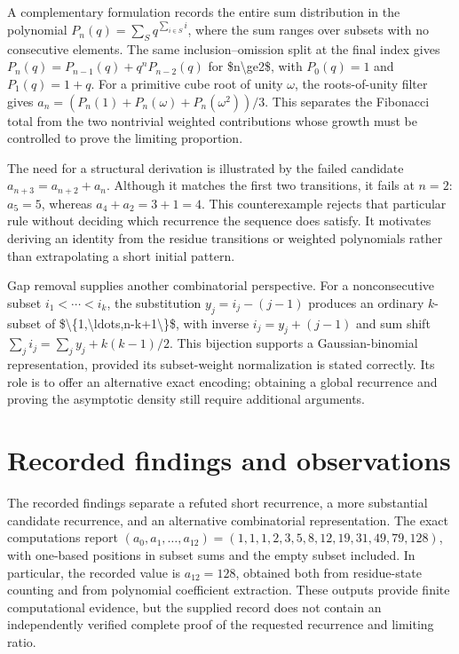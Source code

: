 \documentclass[11pt]{article}
\begin{document}
A complementary formulation records the entire sum distribution in the polynomial $P_n(q)=\sum_S q^{\sum_{i\in S}i}$, where the sum ranges over subsets with no consecutive elements. The same inclusion–omission split at the final index gives $P_n(q)=P_{n-1}(q)+q^nP_{n-2}(q)$ for \$n\textbackslash{}ge2\$, with $P_0(q)=1$ and $P_1(q)=1+q$. For a primitive cube root of unity $\omega$, the roots-of-unity filter gives $a_n=(P_n(1)+P_n(\omega)+P_n(\omega^2))/3$. This separates the Fibonacci total from the two nontrivial weighted contributions whose growth must be controlled to prove the limiting proportion.

The need for a structural derivation is illustrated by the failed candidate $a_{n+3}=a_{n+2}+a_n$. Although it matches the first two transitions, it fails at $n=2$: $a_5=5$, whereas $a_4+a_2=3+1=4$. This counterexample rejects that particular rule without deciding which recurrence the sequence does satisfy. It motivates deriving an identity from the residue transitions or weighted polynomials rather than extrapolating a short initial pattern.

Gap removal supplies another combinatorial perspective. For a nonconsecutive subset $i_1<\cdots<i_k$, the substitution $y_j=i_j-(j-1)$ produces an ordinary $k$-subset of \$\textbackslash{}\{1,\textbackslash{}ldots,n-k+1\textbackslash{}\}\$, with inverse $i_j=y_j+(j-1)$ and sum shift $\sum_j i_j=\sum_j y_j+k(k-1)/2$. This bijection supports a Gaussian-binomial representation, provided its subset-weight normalization is stated correctly. Its role is to offer an alternative exact encoding; obtaining a global recurrence and proving the asymptotic density still require additional arguments.

\section{Recorded findings and observations}
The recorded findings separate a refuted short recurrence, a more substantial candidate recurrence, and an alternative combinatorial representation. The exact computations report $(a_0,a_1,\ldots,a_{12})=(1,1,1,2,3,5,8,12,19,31,49,79,128)$, with one-based positions in subset sums and the empty subset included. In particular, the recorded value is $a_{12}=128$, obtained both from residue-state counting and from polynomial coefficient extraction. These outputs provide finite computational evidence, but the supplied record does not contain an independently verified complete proof of the requested recurrence and limiting ratio.
\end{document}
